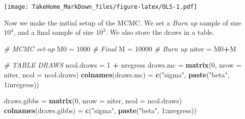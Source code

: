 \documentclass[
]{article}
\newenvironment{Shaded}{\begin{snugshade}}{\end{snugshade}}
\newcommand{\CommentTok}[1]{\textcolor[rgb]{0.56,0.35,0.01}{\textit{#1}}}
\newcommand{\DataTypeTok}[1]{\textcolor[rgb]{0.13,0.29,0.53}{#1}}
\newcommand{\DecValTok}[1]{\textcolor[rgb]{0.00,0.00,0.81}{#1}}
\newcommand{\KeywordTok}[1]{\textcolor[rgb]{0.13,0.29,0.53}{\textbf{#1}}}
\newcommand{\NormalTok}[1]{#1}
\newcommand{\OperatorTok}[1]{\textcolor[rgb]{0.81,0.36,0.00}{\textbf{#1}}}
\newcommand{\StringTok}[1]{\textcolor[rgb]{0.31,0.60,0.02}{#1}}
\begin{document}
\begin{Shaded}
\end{Shaded}

\texttt{[image: TakeHome\_MarkDown\_files/figure-latex/OLS-1.pdf]}

Now we make the initial setup of the MCMC. We set a \emph{Burn up}
sample of size \(10^4\), and a final sample of size \(10^3\). We also
store the draws in a table.

\begin{Shaded}
\begin{Highlighting}[]
\CommentTok{# MCMC set-up}
\NormalTok{M0    =}\StringTok{ }\DecValTok{1000}  \CommentTok{# Final}
\NormalTok{M     =}\StringTok{ }\DecValTok{10000} \CommentTok{# Burn up}
\NormalTok{niter =}\StringTok{ }\NormalTok{M0}\OperatorTok{+}\NormalTok{M}


\CommentTok{# TABLE DRAWS}
\NormalTok{ncol.draws =}\StringTok{ }\DecValTok{1} \OperatorTok{+}\StringTok{ }\NormalTok{nregress}
\NormalTok{draws.mc =}\StringTok{ }\KeywordTok{matrix}\NormalTok{(}\DecValTok{0}\NormalTok{, }\DataTypeTok{nrow =}\NormalTok{ niter, }\DataTypeTok{ncol =}\NormalTok{ ncol.draws)}
\KeywordTok{colnames}\NormalTok{(draws.mc) =}\StringTok{ }\KeywordTok{c}\NormalTok{(}\StringTok{"sigma"}\NormalTok{, }\KeywordTok{paste}\NormalTok{(}\StringTok{"beta"}\NormalTok{, }\DecValTok{1}\OperatorTok{:}\NormalTok{nregress))}

\NormalTok{draws.gibbs =}\StringTok{ }\KeywordTok{matrix}\NormalTok{(}\DecValTok{0}\NormalTok{, }\DataTypeTok{nrow =}\NormalTok{ niter, }\DataTypeTok{ncol =}\NormalTok{ ncol.draws)}
\KeywordTok{colnames}\NormalTok{(draws.gibbs) =}\StringTok{ }\KeywordTok{c}\NormalTok{(}\StringTok{"sigma"}\NormalTok{, }\KeywordTok{paste}\NormalTok{(}\StringTok{"beta"}\NormalTok{, }\DecValTok{1}\OperatorTok{:}\NormalTok{nregress))}
\end{Highlighting}
\end{Shaded}
\end{document}
